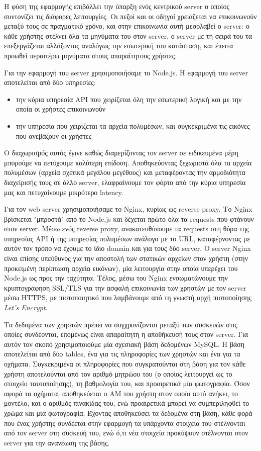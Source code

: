 \documentclass[../thesis.tex]{subfiles}
\begin{document}
Η φύση της εφαρμογής επιβάλλει την ύπαρξη ενός κεντρικού server ο οποίος συντονίζει τις διάφορες λειτουργίες.
Οι πεζοί και οι οδηγοί χρειάζεται να επικοινωνούν μεταξύ τους σε πραγματικό χρόνο, και στην επικοινωνία αυτή μεσολαβεί ο server: ο κάθε χρήστης στέλνει όλα τα μηνύματα του στον server, ο server με τη σειρά του τα επεξεργάζεται αλλάζοντας αναλόγως την εσωτερική του κατάσταση, και έπειτα προωθεί περαιτέρω μηνύματα στους απαραίτητους χρήστες.

Για την εφαρμογή του server χρησιμοποιήσαμε το Node.js.
Η εφαρμογή του server αποτελείται από δύο υπηρεσίες:
\begin{itemize}
    \item την κύρια υπηρεσία API που χειρίζεται όλη την εσωτερική λογική και με την οποία οι χρήστες επικοινωνούν
    \item την υπηρεσία που χειρίζεται τα αρχεία πολυμέσων, και συγκεκριμένα τις εικόνες που ανεβάζουν οι χρήστες
\end{itemize}
Ο διαχωρισμός αυτός έγινε καθώς διαμερίζοντας τον server σε ειδικευμένα μέρη μπορούμε να πετύχουμε καλύτερη επίδοση.
Αποθηκεύοντας ξεχωριστά όλα τα αρχεία πολυμέσων (αρχεία σχετικά μεγάλου μεγέθους) και μεταφέροντας την αρμοδιότητα διαχείρισής τους σε άλλο server, ελαφραίνουμε τον φόρτο από την κύρια υπηρεσία μας και πετυχαίνουμε μικρότερο latency.

Για τον web server χρησιμοποιήσαμε το Nginx, κυρίως ως reverse proxy.
Το Nginx βρίσκεται "μπροστά" από το Node.js και δέχεται πρώτο όλα τα requests που φτάνουν στον server.
Μέσω ενός reverse proxy, ανακατευθύνουμε τα requests στη θύρα της υπηρεσίας API ή της υπηρεσίας πολυμέσων ανάλογα με το URL, καταφέρνοντας με αυτόν τον τρόπο να έχουμε το ίδιο domain και για τους δύο server.
Ο server Nginx είναι επίσης υπεύθυνος για την αποστολή των στατικών αρχείων στον χρήστη (στην προκειμένη περίπτωση αρχεία εικόνων), μία λειτουργία στην οποία υπερέχει του Node.js ως προς την ταχύτητα.
Τέλος, μέσω του Nginx ενσωματώνουμε την κρυπτογράφηση SSL/TLS για την ασφαλή επικοινωνία των χρηστών με τον server μέσω HTTPS, με πιστοποιητικό που λαμβάνουμε από τη γνωστή αρχή πιστοποίησης \textit{Let's Encrypt}.

Τα δεδομένα των χρηστών πρέπει να συγχρονίζονται μεταξύ των συσκευών στις οποίες συνδέονται, επομένως είναι απαραίτητη η αποθήκευσή τους στον server.
Για αυτόν τον σκοπό χρησιμοποιούμε μία σχεσιακή βάση δεδομένων MySQL.
Η βάση αποτελείται από δύο tables, ένα για τις πληροφορίες των χρηστών και ένα για τα οχήματα.
Συγκεκριμένα οι πληροφορίες που συγκρατούνται στη βάση για τον κάθε χρήστη αποτελούνται από τον αριθμό μητρώου του (ο οποίος λειτουργεί ως το στοιχείο ταυτοποίησης), τη βαθμολογία του, και προαιρετικά μία φωτογραφία.
Όσον αφορά τα οχήματα, αποθηκεύεται ο ΑΜ του χρήστη στον οποίο αυτό ανήκει, το μοντέλο, και ο αριθμός πινακίδας του, ενώ προαιρετικά μπορεί να συμπεριληφθεί το χρώμα και μία φωτογραφία.
Έχοντας αποθηκεύσει τα δεδομένα στη βάση, κάθε φορά που ένας χρήστης συνδέεται στην εφαρμογή τα υπάρχοντα στοιχεία του στέλνονται από τον server στη συσκευή του, ενώ ό,τι νέα στοιχεία προκύψουν στέλνονται στον server για την ανανέωση της βάσης.
\end{document}
